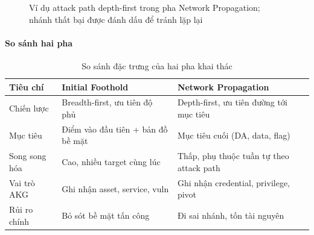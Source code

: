 \begin{figure}[H]
\centering
{}
\caption{Ví dụ attack path depth-first trong pha Network Propagation; nhánh thất bại được đánh dấu để tránh lặp lại}
\label{fig:attack-path-example}
\end{figure}

\paragraph{So sánh hai pha}

\begin{table}[H]
\centering
\caption{So sánh đặc trưng của hai pha khai thác}
\label{tab:so-sanh-hai-pha}
\small
\renewcommand{\arraystretch}{1.3}
\begin{tabular}{|p{3.2cm}|p{6cm}|p{6cm}|}
\hline
\textbf{Tiêu chí} & \textbf{Initial Foothold} & \textbf{Network Propagation} \\
\hline
Chiến lược & Breadth-first, ưu tiên độ phủ & Depth-first, ưu tiên đường tới mục tiêu \\
\hline
Mục tiêu & Điểm vào đầu tiên + bản đồ bề mặt & Mục tiêu cuối (DA, data, flag) \\
\hline
Song song hóa & Cao, nhiều target cùng lúc & Thấp, phụ thuộc tuần tự theo attack path \\
\hline
Vai trò AKG & Ghi nhận asset, service, vuln & Ghi nhận credential, privilege, pivot \\
\hline
Rủi ro chính & Bỏ sót bề mặt tấn công & Đi sai nhánh, tốn tài nguyên \\
\hline
\end{tabular}
\end{table}

